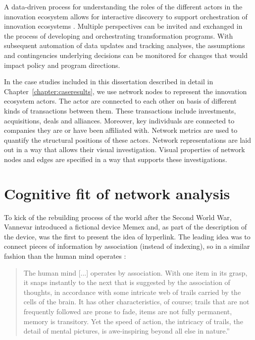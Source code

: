 A data-driven process for understanding the roles of the different actors in the innovation ecosystem allows for interactive discovery to support orchestration of innovation ecosystems \citep{Russell2015}. Multiple perspectives can be invited and exchanged in the process of developing and orchestrating transformation programs. With subsequent automation of data updates and tracking analyses, the assumptions and contingencies underlying decisions can be monitored for changes that would impact policy and program directions.

In the case studies included in this dissertation described in detail in Chapter~\ref{chapter:caseresults}, we use network nodes to represent the innovation ecosystem actors. The actor are connected to each other on basis of different kinds of transactions between them. These transactions include investments, acquisitions, deals and alliances. Moreover, key individuals are connected to companies they are or have been affiliated with. Network metrics are used to quantify the structural positions of these actors. Network representations are laid out in a way that allows their visual investigation. Visual properties of network nodes and edges are specified in a way that supports these investigations.

\section{Cognitive fit of network analysis}

To kick of the rebuilding process of the world after the Second World War, Vannevar \cite{Bush1945} introduced a fictional device Memex and, as part of the description of the device, was the first to present the idea of hyperlink. The leading idea was to connect pieces of information by association (instead of indexing), so in a similar fashion than the human mind operates \citep{Bush1945}: 

\begin{quote}
The human mind [...] operates by association. With one item in its grasp, it snaps instantly to the next that is suggested by the association of thoughts, in accordance with some intricate web of trails carried by the cells of the brain. It has other characteristics, of course; trails that are not frequently followed are prone to fade, items are not fully permanent, memory is transitory. Yet the speed of action, the intricacy of trails, the detail of mental pictures, is awe-inspiring beyond all else in nature.” 
\end{quote}


